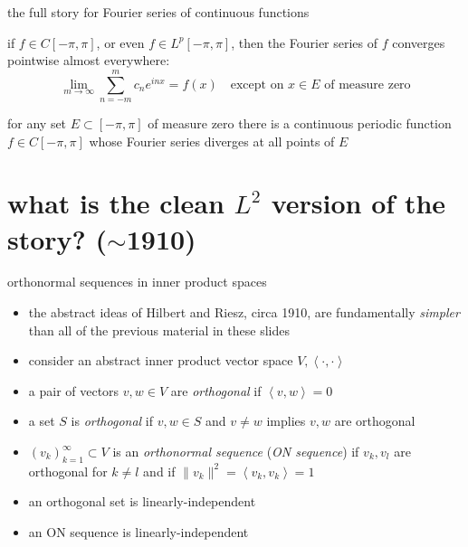 \documentclass[10pt,
               svgnames,
               hyperref={colorlinks,
                         citecolor=DeepPink4,
                         linkcolor=FireBrick,
                         urlcolor=blue},
               usepdftitle=false]{beamer}
\newcommand{\ip}[2]{\left<#1,#2\right>}
\begin{document}
\begin{frame}{the full story for Fourier series of continuous functions}

\begin{theorem}[Carleson, 1966]
if $f\in C[-\pi,\pi]$, or even $f\in L^p[-\pi,\pi]$, then the Fourier series of $f$ converges pointwise almost everywhere:
	$$\lim_{m\to\infty} \sum_{n=-m}^m c_n e^{inx} = f(x) \quad \text{except on $x\in E$ of measure zero}$$
\end{theorem}

\begin{theorem}[Katznelson, 1966]
for any set $E\subset [-\pi,\pi]$ of measure zero there is a continuous periodic function $f\in C[-\pi,\pi]$ whose Fourier series diverges at all points of $E$
\end{theorem}
\end{frame}


\section{what is the clean $L^2$ version of the story? ($\sim$1910)}

\begin{frame}{orthonormal sequences in inner product spaces}

\begin{itemize}
\item the abstract ideas of Hilbert and Riesz, circa 1910, are fundamentally \emph{simpler} than all of the previous material in these slides
\item consider an abstract inner product vector space $V, \ip{\cdot}{\cdot}$
\end{itemize}

\begin{definition}
\begin{itemize}
\item a pair of vectors $v,w \in V$ are \emph{orthogonal} if $\ip{v}{w}=0$
\item a set $S$ is \emph{orthogonal} if $v,w\in S$ and $v\ne w$ implies $v,w$ are orthogonal
\item $(v_k)_{k=1}^\infty \subset V$ is an \emph{orthonormal sequence} (\emph{ON sequence}) if $v_k,v_l$ are orthogonal for $k\ne l$ and if $\|v_k\|^2 = \ip{v_k}{v_k} = 1$
\end{itemize}
\end{definition}

\begin{lemma}
\begin{itemize}
\item an orthogonal set is linearly-independent
\item an ON sequence is linearly-independent
\end{itemize}
\end{lemma}
\end{frame}
\end{document}

